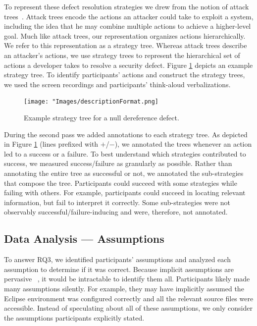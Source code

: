 \documentclass[10pt,journal,compsoc]{IEEEtran}
\begin{document}
To represent these defect resolution strategies we drew from the notion of attack trees~\cite{attackTrees}. 
Attack trees encode the actions an attacker could take to exploit a system, including the idea that he may combine multiple actions to achieve a higher-level goal. 
Much like attack trees, our representation organizes actions hierarchically.
We refer to this representation as a strategy tree.
Whereas attack trees describe an attacker's actions, we use strategy trees to represent the hierarchical set of actions a developer takes to resolve a security defect. 
Figure \ref{fig:description} depicts an example strategy tree.
To identify participants' actions and construct the strategy trees, we used the screen recordings and participants' think-aloud verbalizations. 

\begin{figure}
	\centering
	\texttt{[image: "Images/descriptionFormat.png]}
	\caption{Example strategy tree for a null dereference defect. }
	\label{fig:description} 
\end{figure}



During the second pass we added annotations to each strategy tree. 
As depicted in Figure \ref{fig:description} (lines prefixed with $+$/$-$), we annotated the trees whenever an action led to a success or a failure. 
To best understand which strategies contributed to success, we measured success/failure as granularly as possible.
Rather than annotating the entire tree as successful or not, we annotated the sub-strategies that compose the tree.
Participants could succeed with some strategies while failing with others.
For example, participants could succeed in locating relevant information, but fail to interpret it correctly. 
Some sub-strategies were not observably successful/failure-inducing and were, therefore, not annotated. 


\subsection{Data Analysis --- Assumptions}
\label{sec:assumptionAnalysis}
 
To answer RQ3, we identified participants' assumptions and analyzed each assumption to determine if it was correct.
Because implicit assumptions are pervasive ~\cite{fairclough2003analysing}, it would be intractable to identify them all. 
Participants likely made many assumptions silently. 
For example, they may have implicitly assumed the Eclipse environment was configured correctly and all the relevant source files were accessible.
Instead of speculating about all of these assumptions, we only consider the assumptions participants explicitly stated.
\end{document}
